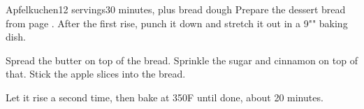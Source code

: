 \documentclass[../Cookbook.tex]{subfiles}
\begin{document}
\begin{recipe}[Apfelkuchen]{Apfelkuchen}{12 servings}{30 minutes, plus bread dough}
	Prepare the dessert bread from page \pageref{BaseDessertBread}.
	After the first rise, punch it down and stretch it out in a 9"" baking dish.

	Spread the butter on top of the bread.
	Sprinkle the sugar and cinnamon on top of that.
	Stick the apple slices into the bread.

	Let it rise a second time, then bake at 350\0F until done, about 20 minutes.
\end{recipe}
\end{document}
